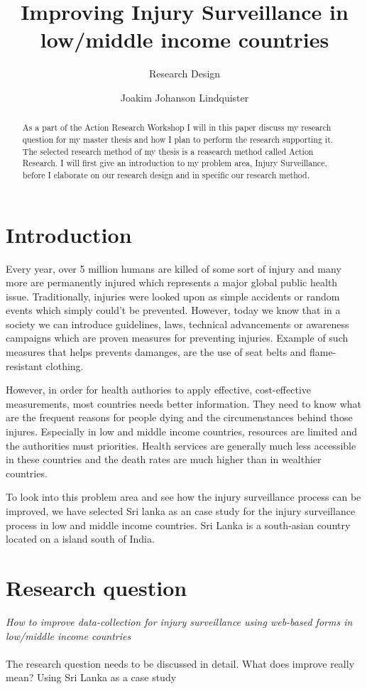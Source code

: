 \documentclass[UKenglish, 12pt]{article}
\title{Improving Injury Surveillance in low/middle income countries}
\subtitle{Research Design}
\author{Joakim Johanson Lindquister}
\begin{document}
\ififorside{}

\begin{abstract}
As a part of the Action Research Workshop I will in this paper discuss my research question for my master thesis and how I plan to perform the research supporting it. The selected research method of my thesis is a reasearch method called Action Research. I will first give an introduction to my problem area, Injury Surveillance, before I elaborate on our research design and in specific our research method.
\end{abstract}

\section*{Introduction} 
Every year, over 5 million humans are killed of some sort of injury and many more are permanently injured\cite[site~12]{who-guide} which represents a major global public health issue. Traditionally, injuries were looked upon as simple accidents or random events which simply could't be prevented. However, today we know that in a society we can introduce guidelines, laws, technical advancements or awareness campaigns which are proven measures for preventing injuries. Example of such measures that helps prevents damanges, are the use of seat belts and flame-resistant clothing.

However, in order for health authories to apply effective, cost-effective measurements, most countries needs better information. They need to know what are the frequent reasons for people dying and the circumenstances behind those injures. Especially in low and middle income countries, resources are limited and the authorities must priorities. Health services are generally much less accessible in these countries and the death rates are much higher than in wealthier countries.

To look into this problem area and see how the injury surveillance process can be improved, we have selected Sri lanka as an case study for the injury surveillance process in low and middle income countries. Sri Lanka is a south-asian country located on a island south of India. 

\section*{Research question}
\emph{How to improve data-collection for injury surveillance using web-based forms in low/middle income countries}
\\ \\
The research question needs to be discussed in detail. What does improve really mean? Using Sri Lanka as a case study \\
\end{document}
